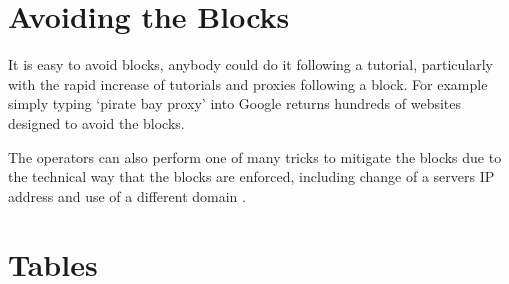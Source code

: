\begin{appendices}
\section{Avoiding the Blocks} \label{app:avoidingblocks}

It is easy to avoid blocks, anybody could do it following a tutorial, particularly with the rapid increase of tutorials and proxies following a block. For example simply typing `pirate bay proxy' into Google returns hundreds of websites designed to avoid the blocks.

The operators can also perform one of many tricks to mitigate the blocks due to the technical way that the blocks are enforced, including change of a servers IP address and use of a different domain \citep{piratebaylegal}.

\section{Tables}



\end{appendices}
